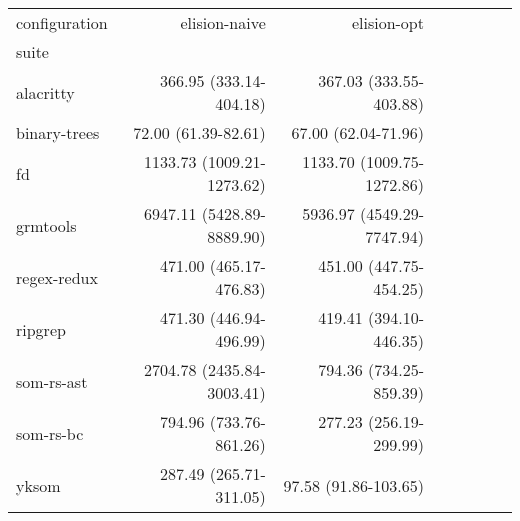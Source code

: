 \begin{tabular}{lrrrrrrr}
\toprule
configuration & elision-naive & elision-opt \\
suite &  &  \\
\midrule
alacritty & 366.95 \footnotesize{(333.14-404.18)} & 367.03 \footnotesize{(333.55-403.88)} \\
binary-trees & 72.00 \footnotesize{(61.39-82.61)} & 67.00 \footnotesize{(62.04-71.96)} \\
fd & 1133.73 \footnotesize{(1009.21-1273.62)} & 1133.70 \footnotesize{(1009.75-1272.86)} \\
grmtools & 6947.11 \footnotesize{(5428.89-8889.90)} & 5936.97 \footnotesize{(4549.29-7747.94)} \\
regex-redux & 471.00 \footnotesize{(465.17-476.83)} & 451.00 \footnotesize{(447.75-454.25)} \\
ripgrep & 471.30 \footnotesize{(446.94-496.99)} & 419.41 \footnotesize{(394.10-446.35)} \\
som-rs-ast & 2704.78 \footnotesize{(2435.84-3003.41)} & 794.36 \footnotesize{(734.25-859.39)} \\
som-rs-bc & 794.96 \footnotesize{(733.76-861.26)} & 277.23 \footnotesize{(256.19-299.99)} \\
yksom & 287.49 \footnotesize{(265.71-311.05)} & 97.58 \footnotesize{(91.86-103.65)} \\
\bottomrule
\end{tabular}
